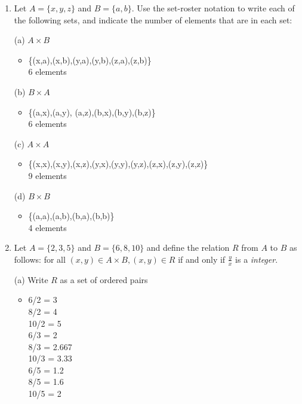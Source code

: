\documentclass[english,12pt,legalpaper]{article}
\begin{document}
\begin{enumerate}
	
	\item
	Let	$A = \{x,y,z\}$ and $B = \{a,b\}$. Use the set-roster notation to write each of the following sets, and indicate the number of elements that are in each set:
	\begin{flushleft}
		(a) $A \times B$ \\
		\begin{itemize}
			\item \{(x,a),(x,b),(y,a),(y,b),(z,a),(z,b)\}
			\\ 6 elements
		\end{itemize}
		(b) $B \times A$ \\ 
		\begin{itemize}
			\item \{(a,x),(a,y), (a,z),(b,x),(b,y),(b,z)\}
			\\ 6 elements
		\end{itemize}
		(c) $A \times A$ \\
		\begin{itemize}
			\item \{(x,x),(x,y),(x,z),(y,x),(y,y),(y,z),(z,x),(z,y),(z,z)\}
			\\ 9 elements
		\end{itemize}
		(d) $B \times B$
		\begin{itemize}
			\item \{(a,a),(a,b),(b,a),(b,b)\}
			\\ 4 elements
		\end{itemize}
	\end{flushleft}
	
	
	\item
	Let $A = \{2,3,5\}$ and $B = \{6,8,10\}$ and define the relation $\textit{R}$ from $A$ to $B$ as follows: for all $(x,y) \in A \times B, (x,y) \in \textit{R}$ if and only if $\frac{y}{x}$ is a \textit{integer}.
	\begin{flushleft}
	(a) Write $\textit{R}$ as a set of ordered pairs 
	\begin{itemize}
		\item 
		6/2 = 3 \\ 
		8/2 = 4 \\
		10/2 = 5 \\
		6/3 = 2 \\
		8/3 = 2.667 \\
		10/3 = 3.33 \\
		6/5 = 1.2\\ 
		8/5 = 1.6 \\
		10/5 = 2 \\ 
		

\end{itemize}
\end{flushleft}
\end{enumerate}
\end{document}
